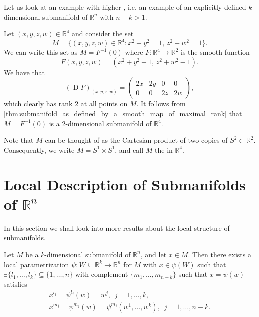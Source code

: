 \documentclass[notoc,notitlepage]{tufte-book}
\DeclareMathOperator{\D}{D}
\begin{document}
Let us look at an example with higher , i.e. an example of
an explicitly defined $k$-dimensional submanifold of $\mathbb{R}^n$ with $n - k
> 1$.

\begin{eg}
  Let $(x, y, z, w) \in \mathbb{R}^4$ and consider the set
  \begin{equation*}
    M = \{ (x, y, z, w) \in \mathbb{R}^4 : x^2 + y^2 = 1, \, z^2 + w^2 = 1 \}.
  \end{equation*}
  We can write this set as $M = F^{-1}(0)$ where $F : \mathbb{R}^4 \to
  \mathbb{R}^2$ is the smooth function
  \begin{equation*}
    F(x, y, z, w) = (x^2 + y^2 - 1, \, z^2 + w^2 - 1).
  \end{equation*}
  We have that
  \begin{equation*}
    (\D F)_{(x, y, z, w)} = \begin{pmatrix}
      2x & 2y & 0  & 0 \\
      0  & 0  & 2z & 2w
    \end{pmatrix},
  \end{equation*}
  which clearly has rank $2$ at all points on $M$. It follows from
  \cref{thm:submanifold_as_defined_by_a_smooth_map_of_maximal_rank} that $M =
  F^{-1}(0)$ is a $2$-dimensional submanifold of $\mathbb{R}^4$.

  Note that $M$ can be thought of as the Cartesian product of two copies of $S^2
  \subset \mathbb{R}^2$. Consequently, we write $M = S^1 \times S^1$, and call
  $M$ the  in $\mathbb{R}^4$.
\end{eg}


\section{Local Description of Submanifolds of \texorpdfstring{$\mathbb{R}^n$}{Rn}}%
\label{sec:local_description_of_submanifolds_of_r_n_}

In this section we shall look into more results about the local structure of
submanifolds.

\begin{thm}\label{thm:implicit_submanifold_theorem}
  Let $M$ be a $k$-dimensional submanifold of $\mathbb{R}^n$, and let $x \in M$.
  Then there exists a local parametrization $\psi : W \subseteq \mathbb{R}^k \to
  \mathbb{R}^n$ for $M$ with $x \in \psi(W)$ such that $\exists \{ l_1, \ldots,
  l_k \} \subseteq \{ 1, \ldots, n \}$ with complement $\{ m_1, \ldots, m_{n -
  k} \}$ such that $x = \psi(w)$ satisfies
  \begin{gather*}
    x^{l_j} = \psi^{l_j}(w) = w^j, \enspace j = 1, \ldots, k, \\
    x^{m_j} = \psi^{m_j}(w) = \psi^{m_j} (w^1, \ldots, w^k), \enspace j = 1,
    \ldots, n - k.
  \end{gather*}
\end{thm}
\end{document}
